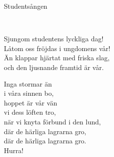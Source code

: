 \begin{song}{Studentsången}
	
	
	\\
	
	
	Sjungom studentens lyckliga dag!\\
	Låtom oss fröjdas i ungdomens vår!\\
	Än klappar hjärtat med friska slag,\\
	och den ljusnande framtid är vår.\\
	\begin{repetition}
		Inga stormar än\\
		i våra sinnen bo,\\
		hoppet är vår vän\\
		vi dess löften tro,\\
		när vi knyta förbund i den lund,\\
		där de härliga lagrarna gro,\\
		där de härliga lagrarna gro.\\
		Hurra!
	\end{repetition}
	
\end{song}
